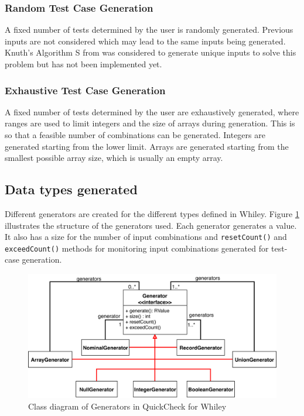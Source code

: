 \subsubsection{Random Test Case Generation}

A fixed number of tests determined by the user is randomly generated. Previous inputs are not considered which may lead to the same inputs being generated.
Knuth's Algorithm S from \cite{artProgv2} was considered to generate unique inputs to solve this problem but has not been implemented yet.

\subsubsection{Exhaustive Test Case Generation}
A fixed number of tests determined by the user are exhaustively generated, where ranges are used to limit integers and the size of arrays during generation. This is so that a feasible number of combinations can be generated. Integers are generated starting from the lower limit. Arrays are generated starting from the smallest possible array size, which is usually an empty array.

\subsection{Data types generated}
Different generators are created for the different types defined in Whiley. 
Figure \ref{fig:qc-generators} illustrates the structure of the generators used.
Each generator generates a value. It also has a size for the number of input combinations and \texttt{resetCount()} and \texttt{exceedCount()} methods for monitoring input combinations generated for test-case generation.
 
\begin{figure}
	\caption{Class diagram of Generators in QuickCheck for Whiley}
	\label{fig:qc-generators}
	\includegraphics[width=\textwidth]{qc-generators}
	\centering
\end{figure}

